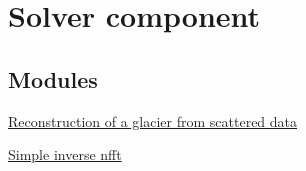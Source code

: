 \hypertarget{group__examples__solver}{
\section{Solver component}
\label{group__examples__solver}
}
\subsection*{Modules}
\begin{CompactItemize}
\item 
\hyperlink{group__examples__solver__glacier}{Reconstruction of a glacier from scattered data}
\item 
\hyperlink{group__examples__solver__simple}{Simple inverse nfft}
\end{CompactItemize}
